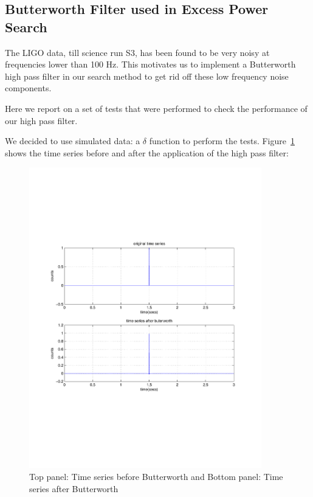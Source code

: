 \clearpage

\subsection{Butterworth Filter used in Excess Power Search}

The LIGO data, till science run S3, has been found to be very noisy 
at frequencies lower than 100 Hz. This motivates us to implement a 
Butterworth high pass filter in our search method to get rid off these 
low frequency noise components. 

Here we report on a set of tests that were performed to check the
performance of our high pass filter.

We decided to use simulated data: a $\delta$ function to perform the 
tests. Figure~\ref{fig:checkbuttertimeseries} shows the time series before 
and after the application of the high pass filter:
\begin{figure}[h]
\begin{center}
\includegraphics[width=0.9\textwidth]{figures/checkbuttertimeseries}
\caption{Top panel: Time series before Butterworth and 
Bottom panel: Time series after Butterworth} \label{fig:checkbuttertimeseries}
\end{center}
\end{figure}

